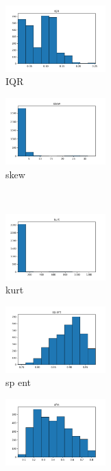 \documentclass[a4paper]{article}    %
\begin{document}
\begin{figure}[H]
\begin{subfigure}{0.32\textwidth}
        \includegraphics[width=3.85cm]{raw_4_IQR}
        \caption{IQR}
        \label{fig:sub_raw_5}
    \end{subfigure}\hfill
    \begin{subfigure}{0.32\textwidth}
        \centering
        \includegraphics[width=3.85cm]{raw_5_skew}
        \caption{skew}
        \label{fig:sub_raw_6}
    \end{subfigure}
    \\
    \begin{subfigure}{0.32\textwidth}
        \centering
        \includegraphics[width=3.85cm]{raw_6_kurt}
        \caption{kurt}
        \label{fig:sub_raw_7}
    \end{subfigure}\hfill
    \begin{subfigure}{0.32\textwidth}
        \centering
        \includegraphics[width=3.85cm]{raw_7_sp_ent}
        \caption{sp ent}
        \label{fig:sub_raw_8}
    \end{subfigure}\hfill
    \begin{subfigure}{0.32\textwidth}
        \centering
        \includegraphics[width=3.85cm]{raw_8_sfm}

\end{subfigure}
\end{figure}
\end{document}
